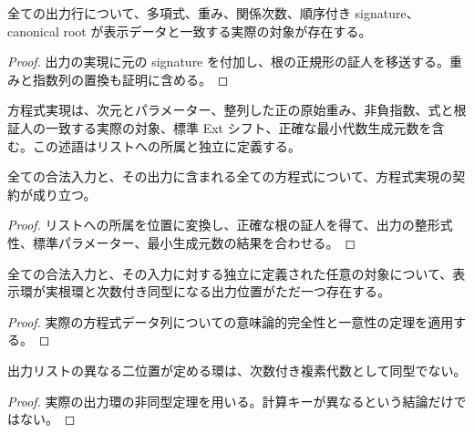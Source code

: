 \begin{theorem}[各行の正確な根の証人]
\label{thm:witness}
\leanok
全ての出力行について、多項式、重み、関係次数、順序付き signature、canonical root が表示データと一致する実際の対象が存在する。
\end{theorem}
\begin{proof}
\leanok
{}
出力の実現に元の signature を付加し、根の正規形の証人を移送する。重みと指数列の置換も証明に含める。
\end{proof}

\begin{definition}[公開する健全性の契約]
\label{def:contract}
\leanok
{}
方程式実現は、次元とパラメーター、整列した正の原始重み、非負指数、式と根証人の一致する実際の対象、標準 Ext シフト、正確な最小代数生成元数を含む。この述語はリストへの所属と独立に定義する。
\end{definition}

\begin{theorem}
\label{thm:sound}
\leanok
全ての合法入力と、その出力に含まれる全ての方程式について、方程式実現の契約が成り立つ。
\end{theorem}
\begin{proof}
\leanok
{}
リストへの所属を位置に変換し、正確な根の証人を得て、出力の整形式性、標準パラメーター、最小生成元数の結果を合わせる。
\end{proof}

\begin{theorem}
\label{thm:complete}
\leanok
全ての合法入力と、その入力に対する独立に定義された任意の対象について、表示環が実根環と次数付き同型になる出力位置がただ一つ存在する。
\end{theorem}
\begin{proof}
\leanok
{}
実際の方程式データ列についての意味論的完全性と一意性の定理を適用する。
\end{proof}

\begin{theorem}
\label{thm:noniso}
\leanok
出力リストの異なる二位置が定める環は、次数付き複素代数として同型でない。
\end{theorem}
\begin{proof}
\leanok
{}
実際の出力環の非同型定理を用いる。計算キーが異なるという結論だけではない。
\end{proof}


